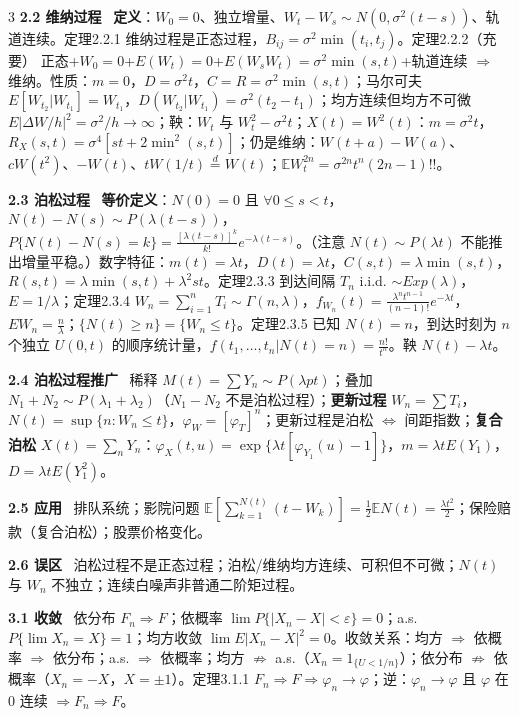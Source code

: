 \documentclass[UTF8,a4paper]{ctexart}
\newcommand{\Sec}[1]{\par\vspace{1.4pt}{\bfseries\color{blue!65!black}\small #1}\par\vspace{0.4pt}}
\newcommand{\T}[1]{{\bfseries #1}\ }
\newcommand{\B}[1]{\textbf{#1}}
\newcommand{\Hi}[1]{\textcolor{red!70!black}{#1}}
\newcommand{\E}{\mathbb{E}}
\begin{document}
\begin{multicols}{3}
\T{2.2 维纳过程} \B{定义}：$W_0=0$、独立增量、$W_t-W_s\sim N(0,\sigma^2(t-s))$、轨道连续。\Hi{定理2.2.1} 维纳过程是正态过程，$B_{ij}=\sigma^2\min(t_i,t_j)$。\Hi{定理2.2.2（充要）} 正态+$W_0=0$+$E(W_t)=0$+$E(W_sW_t)=\sigma^2\min(s,t)$+轨道连续 $\Rightarrow$ 维纳。性质：$m=0$，$D=\sigma^2t$，$C=R=\sigma^2\min(s,t)$；马尔可夫 $E[W_{t_2}|W_{t_1}]=W_{t_1}$，$D(W_{t_2}|W_{t_1})=\sigma^2(t_2-t_1)$；均方连续但\Hi{均方不可微} $E|\Delta W/h|^2=\sigma^2/h\to\infty$；鞅：$W_t$ 与 $W_t^2-\sigma^2t$；$X(t)=W^2(t)$：$m=\sigma^2t$，$R_X(s,t)=\sigma^4[st+2\min^2(s,t)]$；仍是维纳：$W(t+a)-W(a)$、$cW(t^2)$、$-W(t)$、$tW(1/t)\overset d=W(t)$；$\E W_t^{2n}=\sigma^{2n}t^n(2n-1)!!$。

\T{2.3 泊松过程} \B{等价定义}：$N(0)=0$ 且 $\forall0\le s<t$，$N(t)-N(s)\sim P(\lambda(t-s))$，$P\{N(t)-N(s)=k\}=\frac{[\lambda(t-s)]^k}{k!}e^{-\lambda(t-s)}$。（\Hi{注意} $N(t)\sim P(\lambda t)$ 不能推出增量平稳。）数字特征：$m(t)=\lambda t$，$D(t)=\lambda t$，$C(s,t)=\lambda\min(s,t)$，$R(s,t)=\lambda\min(s,t)+\lambda^2st$。\Hi{定理2.3.3} 到达间隔 $T_n$ i.i.d. $\sim Exp(\lambda)$，$E=1/\lambda$；\Hi{定理2.3.4} $W_n=\sum_{i=1}^nT_i\sim\Gamma(n,\lambda)$，$f_{W_n}(t)=\frac{\lambda^nt^{n-1}}{(n-1)!}e^{-\lambda t}$，$EW_n=\frac n\lambda$；$\{N(t)\ge n\}=\{W_n\le t\}$。\Hi{定理2.3.5} 已知 $N(t)=n$，到达时刻为 $n$ 个独立 $U(0,t)$ 的顺序统计量，$f(t_1,\dots,t_n|N(t)=n)=\frac{n!}{t^n}$。\Hi{鞅} $N(t)-\lambda t$。

\T{2.4 泊松过程推广} 稀释 $M(t)=\sum Y_n\sim P(\lambda pt)$；叠加 $N_1+N_2\sim P(\lambda_1+\lambda_2)$（$N_1-N_2$ 不是泊松过程）；\B{更新过程} $W_n=\sum T_i$，$N(t)=\sup\{n:W_n\le t\}$，$\varphi_W=[\varphi_T]^n$；更新过程是泊松 $\iff$ 间距指数；\B{复合泊松} $X(t)=\sum_nY_n$：$\varphi_X(t,u)=\exp\{\lambda t[\varphi_{Y_1}(u)-1]\}$，$m=\lambda tE(Y_1)$，$D=\lambda tE(Y_1^2)$。

\T{2.5 应用} 排队系统；影院问题 $\E[\sum_{k=1}^{N(t)}(t-W_k)]=\frac12\E N(t)=\frac{\lambda t^2}2$；保险赔款（复合泊松）；股票价格变化。

\T{2.6 误区} 泊松过程不是正态过程；泊松/维纳均方连续、可积但\Hi{不可微}；$N(t)$ 与 $W_n$ 不独立；连续白噪声非普通二阶矩过程。

\Sec{第3章 均方分析}

\T{3.1 收敛} 依分布 $F_n\Rightarrow F$；依概率 $\lim P\{|X_n-X|<\varepsilon\}=0$；a.s. $P\{\lim X_n=X\}=1$；\Hi{均方收敛 $\lim E|X_n-X|^2=0$}。\Hi{收敛关系}：均方 $\Rightarrow$ 依概率 $\Rightarrow$ 依分布；a.s. $\Rightarrow$ 依概率；均方 $\nRightarrow$ a.s.（$X_n=1_{\{U<1/n\}}$）；依分布 $\nRightarrow$ 依概率（$X_n=-X$，$X=\pm1$）。\Hi{定理3.1.1} $F_n\Rightarrow F\Rightarrow\varphi_n\to\varphi$；逆：$\varphi_n\to\varphi$ 且 $\varphi$ 在 $0$ 连续 $\Rightarrow F_n\Rightarrow F$。


\end{multicols}
\end{document}
